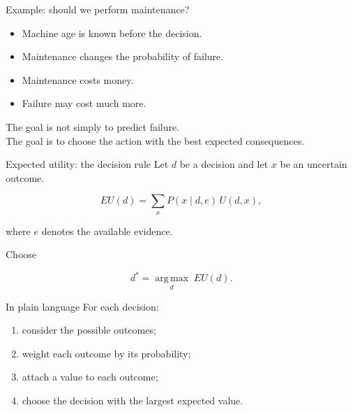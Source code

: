 \documentclass[aspectratio=43,11pt]{beamer}
\begin{document}
\begin{frame}{Example: should we perform maintenance?}
\small
\begin{center}
\end{center}

\begin{itemize}
  \item Machine age is known before the decision.
  \item Maintenance changes the probability of failure.
  \item Maintenance costs money.
  \item Failure may cost much more.
\end{itemize}

The goal is not simply to predict failure.\\
The goal is to choose the action with the best expected consequences.

\end{frame}

\begin{frame}{Expected utility: the decision rule}
\small
Let \(d\) be a decision and let \(x\) be an uncertain outcome.

\[
EU(d)
=
\sum_x P(x\mid d,e)\,U(d,x),
\]

where \(e\) denotes the available evidence.

Choose

\[
d^*
=
\underset{d}{\operatorname{arg\,max}}\;EU(d).
\]

\begin{block}{In plain language}
For each decision:
\begin{enumerate}
  \item consider the possible outcomes;
  \item weight each outcome by its probability;
  \item attach a value to each outcome;
  \item choose the decision with the largest expected value.
\end{enumerate}
\end{block}

\end{frame}
\end{document}
